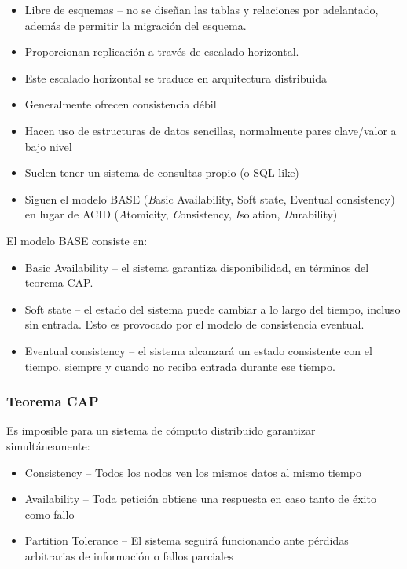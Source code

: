 \documentclass[
]{book}
\providecommand{\tightlist}{%
  \setlength{\itemsep}{0pt}\setlength{\parskip}{0pt}}
\begin{document}
\begin{itemize}
\tightlist
\item
  Libre de esquemas -- no se diseñan las tablas y relaciones por adelantado, además de permitir la migración del esquema.
\item
  Proporcionan replicación a través de escalado horizontal.
\item
  Este escalado horizontal se traduce en arquitectura distribuida
\item
  Generalmente ofrecen consistencia débil
\item
  Hacen uso de estructuras de datos sencillas, normalmente pares clave/valor a bajo nivel
\item
  Suelen tener un sistema de consultas propio (o SQL-like)
\item
  Siguen el modelo BASE (\emph{B}asic Availability, Soft state, Eventual consistency) en lugar de ACID (\emph{A}tomicity, \emph{C}onsistency, \emph{I}solation, \emph{D}urability)
\end{itemize}

El modelo BASE consiste en:

\begin{itemize}
\tightlist
\item
  Basic Availability -- el sistema garantiza disponibilidad, en términos del teorema CAP.
\item
  Soft state -- el estado del sistema puede cambiar a lo largo del tiempo, incluso sin entrada. Esto es provocado por el modelo de consistencia eventual.
\item
  Eventual consistency -- el sistema alcanzará un estado consistente con el tiempo, siempre y cuando no reciba entrada durante ese tiempo.
\end{itemize}

\hypertarget{teorema-cap}{%
\subsubsection{Teorema CAP}\label{teorema-cap}}

Es imposible para un sistema de cómputo distribuido garantizar simultáneamente:

\begin{itemize}
\tightlist
\item
  Consistency -- Todos los nodos ven los mismos datos al mismo tiempo
\item
  Availability -- Toda petición obtiene una respuesta en caso tanto de éxito como fallo
\item
  Partition Tolerance -- El sistema seguirá funcionando ante pérdidas arbitrarias de información o fallos parciales
\end{itemize}
\end{document}
